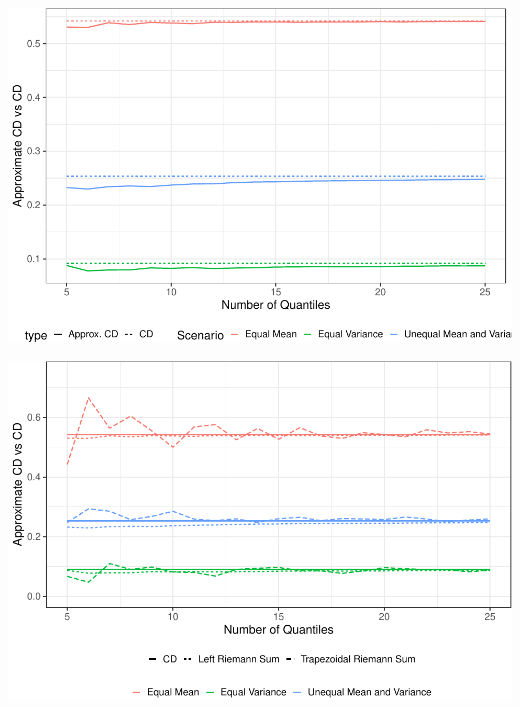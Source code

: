 \documentclass[
]{article}
\begin{document}
\begin{center}\includegraphics{cd_approx_2_files/figure-latex/diff-1} \end{center}

\begin{center}\includegraphics{cd_approx_2_files/figure-latex/diff2-1} \end{center}
\end{document}
